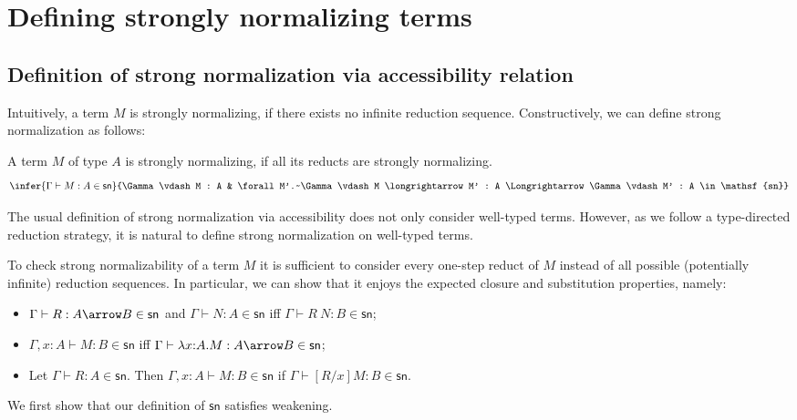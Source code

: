 \documentclass{article}
\newcommand{\csn}{\mathsf{sn}}
\newcommand{\red}{\longrightarrow}
\newcommand{\imply}{\Longrightarrow}
\begin{document}

\section{Defining strongly normalizing terms}
\subsection{Definition of strong normalization via accessibility relation}
Intuitively, a term $M$ is strongly normalizing, if there exists no infinite reduction sequence. Constructively, we can define strong normalization as follows:

\begin{definition}\label{def:norm}
A term $M$ of type $A$ is strongly normalizing, if all its reducts are strongly
normalizing.\\
\[
\infer{\Gamma \vdash M : A \in \csn}
      {\Gamma \vdash M : A & \forall M'.~\Gamma \vdash M \red M' : A \imply \Gamma \vdash M' : A \in \csn}
\]
\end{definition}

The usual definition of strong normalization via accessibility does not only consider well-typed terms. However, as we follow a type-directed reduction strategy, it is natural to define strong normalization on well-typed terms.

To check strong normalizability of a term $M$ it is sufficient to consider every one-step
reduct of $M$ instead of all possible (potentially infinite) reduction sequences. In particular, we can show that it enjoys the expected closure and substitution properties, namely:
\begin{itemize}
\item $\Gamma \vdash R : A \arrow B \in \csn$ and $\Gamma \vdash N : A \in \csn$
    iff $\Gamma \vdash R~N : B \in \csn$;
  \item $\Gamma, x{:}A \vdash M : B \in \csn$ iff $\Gamma \vdash  \lambda x{:}A.M : A \arrow B \in \csn$;
  \item Let  $\Gamma \vdash R : A \in
   \csn$. Then $\Gamma, x{:}A \vdash M : B \in \csn$ if $\Gamma \vdash [R/x]M : B \in \csn$.
\end{itemize}

We first show that our definition of $\csn$ satisfies weakening.
\end{document}
